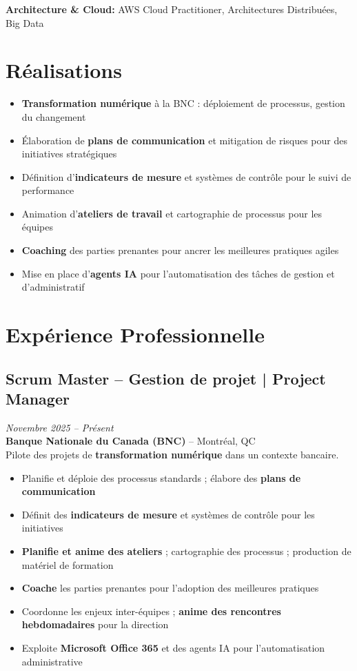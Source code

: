 \documentclass[11pt,a4paper]{article}
\begin{document}
\textbf{Architecture \& Cloud:} AWS Cloud Practitioner, Architectures Distribuées, Big Data

\vspace{6pt}

\section*{Réalisations}
\begin{itemize}
    \item \textbf{Transformation numérique} à la BNC : déploiement de processus, gestion du changement
    \item Élaboration de \textbf{plans de communication} et mitigation de risques pour des initiatives stratégiques
    \item Définition d'\textbf{indicateurs de mesure} et systèmes de contrôle pour le suivi de performance
    \item Animation d'\textbf{ateliers de travail} et cartographie de processus pour les équipes
    \item \textbf{Coaching} des parties prenantes pour ancrer les meilleures pratiques agiles
    \item Mise en place d'\textbf{agents IA} pour l'automatisation des tâches de gestion et d'administratif
\end{itemize}

\section*{Expérience Professionnelle}

\subsection*{Scrum Master -- Gestion de projet | Project Manager} \hfill \textit{Novembre 2025 -- Présent}\\
\textbf{Banque Nationale du Canada (BNC)} -- Montréal, QC\\
Pilote des projets de \textbf{transformation numérique} dans un contexte bancaire.
\begin{itemize}
    \item Planifie et déploie des processus standards ; élabore des \textbf{plans de communication}
    \item Définit des \textbf{indicateurs de mesure} et systèmes de contrôle pour les initiatives
    \item \textbf{Planifie et anime des ateliers} ; cartographie des processus ; production de matériel de formation
    \item \textbf{Coache} les parties prenantes pour l'adoption des meilleures pratiques
    \item Coordonne les enjeux inter-équipes ; \textbf{anime des rencontres hebdomadaires} pour la direction
    \item Exploite \textbf{Microsoft Office 365} et des agents IA pour l'automatisation administrative
\end{itemize}
\end{document}
